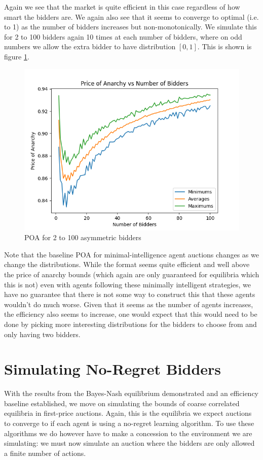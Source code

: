 \documentclass[12pt,twoside]{reedthesis}
\begin{document}
Again we see that the market is quite efficient in this case regardless of how smart the bidders are. We again also see that it seems to converge to optimal (i.e. to 1) as the number of bidders increases but non-monotonically. We simulate this for 2 to 100 bidders again 10 times at each number of bidders, where on odd numbers we allow the extra bidder to have distribution $[0,1]$. This is shown is figure \ref{figure:zi_assymetric}.

\begin{figure}[h!]
	\centering
	\includegraphics[scale=0.8]{Figures/zi_asymmetric}
	\caption{POA for 2 to 100 asymmetric bidders}
	\label{figure:zi_assymetric}
\end{figure}

Note that the baseline POA for minimal-intelligence agent auctions changes as we change the distributions. While the format seems quite efficient and well above the price of anarchy bounds (which again are only guaranteed for equilibria which this is not) even with agents following these minimally intelligent strategies, we have no guarantee that there is not some way to construct this that these agents wouldn't do much worse. Given that it seems as the number of agents increases, the efficiency also seems to increase, one would expect that this would need to be done by picking more interesting distributions for the bidders to choose from and only having two bidders.

\section{Simulating No-Regret Bidders}
With the results from the Bayes-Nash equilibrium demonstrated and an efficiency baseline established, we move on simulating the bounds of coarse correlated equilibria in first-price auctions. Again, this is the equilibria we expect auctions to converge to if each agent is using a no-regret learning algorithm. To use these algorithms we do however have to make a concession to the environment we are simulating: we must now simulate an auction where the bidders are only allowed a finite number of actions.
\end{document}

